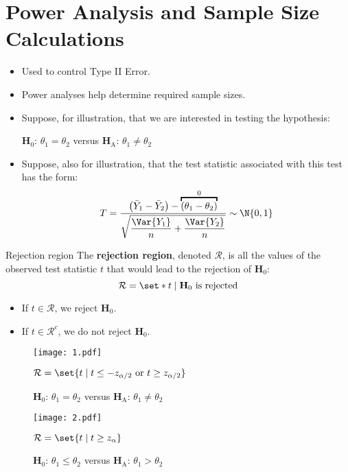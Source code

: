 \section{Power Analysis and Sample Size Calculations}
\begin{itemize}
      \item Used to control Type II Error.
      \item Power analyses help determine required sample sizes.
      \item Suppose, for illustration, that we are interested in testing the hypothesis:
            \begin{tightcenter}
                  $ \mathbf{H}_0 $: $ \theta_1=\theta_2 $ versus $ \mathbf{H}_\text{A} $: $ \theta_1\ne \theta_2 $
            \end{tightcenter}
      \item Suppose, also for illustration, that the test statistic associated with this test has
            the form:
            \[ T=\frac{\bigl(\bar{Y}_1-\bar{Y}_2\bigr)-\overbracket{(\theta_1-\theta_2)}^0}{\displaystyle \sqrt{\frac{\Var{Y_1}}{n}+\frac{\Var{Y_2}}{n} }}\sim \N{0,1}  \]
\end{itemize}
\begin{Definition}{Rejection region}{}
      The \textbf{rejection region}, denoted $ \mathcal{R} $, is
      all the values of the observed test statistic $ t $ that would lead to the rejection
      of $ \mathbf{H}_0 $:
      \[ \mathcal{R}=\set*{t\mid \mathbf{H}_0\text{ is rejected}} \]
\end{Definition}
\begin{itemize}
      \item If $ t\in\mathcal{R} $, we reject $ \mathbf{H}_0 $.
      \item If $ t\in\mathcal{R}^c $, we do not reject $ \mathbf{H}_0 $.
\end{itemize}
\begin{figure}[!htbp]
      \centering
      \texttt{[image: 1.pdf]}
      \caption{$ \mathbf{H}_0 $: $ \theta_1=\theta_2 $ versus $ \mathbf{H}_\text{A} $: $ \theta_1\ne \theta_2 $}{$ \mathcal{R}=\set{t\mid t\le -z_{\alpha/2}\text{ or }t\ge z_{\alpha/2}} $}
\end{figure}
\begin{figure}[!htbp]
      \centering
      \texttt{[image: 2.pdf]}
      \caption{$ \mathbf{H}_0 $: $ \theta_1\le\theta_2 $ versus $ \mathbf{H}_\text{A} $: $ \theta_1>\theta_2 $}{$ \mathcal{R}=\set{t\mid t\ge z_{\alpha}} $}
\end{figure}
